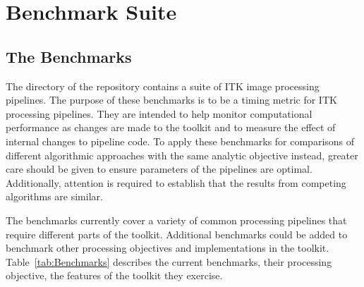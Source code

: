 \documentclass{InsightArticle}
\begin{document}
\section{Benchmark Suite}

\subsection{The Benchmarks}

The  directory of the 
repository contains a suite of ITK image processing pipelines.  The purpose of
these benchmarks is to be a timing metric for ITK processing pipelines.  They
are intended to help monitor computational performance as changes are made to
the toolkit and to measure the effect of internal changes to pipeline code.
To apply these benchmarks for comparisons of different algorithmic approaches
with the same analytic objective instead, greater care should be given to
ensure parameters of the pipelines are optimal. Additionally, attention is
required to establish that the results from competing algorithms are similar.

The benchmarks currently cover a variety of common processing pipelines that
require different parts of the toolkit. Additional benchmarks could be added
to benchmark other processing objectives and implementations in the toolkit.
Table~\ref{tab:Benchmarks} describes the current benchmarks, their processing
objective, the features of the toolkit they exercise.
\end{document}
